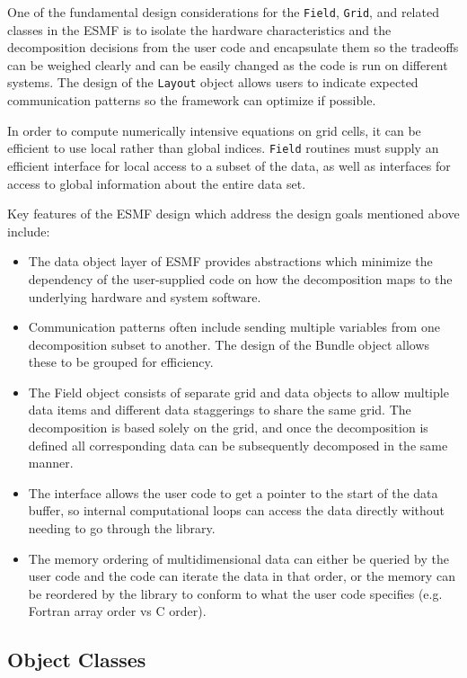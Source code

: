 One of the fundamental design considerations for the {\tt Field},
{\tt Grid}, and related classes in the ESMF is to isolate 
the hardware characteristics and the decomposition decisions from the
user code and encapsulate them so the tradeoffs can be 
weighed clearly and can be easily changed as the code is 
run on different systems.  The design of the {\tt Layout} object
allows users to indicate expected communication patterns so 
the framework can optimize if possible.

In order to compute numerically intensive equations on grid
cells, it can be efficient to use local rather 
than global indices.  {\tt Field} routines
must supply an efficient interface for local access to a
subset of the data, as well as interfaces for access to
global information about the entire data set.

Key features of the ESMF design which address the design goals
mentioned above include:
\begin{itemize}
\item The data object layer of ESMF provides abstractions which
minimize the dependency of the user-supplied code on 
how the decomposition maps to the underlying hardware
and system software.
\item Communication patterns often include sending multiple
variables from one decomposition subset to another.  
The design of the Bundle object
allows these to be grouped for efficiency.
\item The Field object consists of separate grid and data 
objects to allow multiple data items and different data staggerings
to share the same grid.  The decomposition is based solely on
the grid, and once the decomposition is defined all corresponding
data can be subsequently decomposed in the same manner.
\item The interface allows the user code to get a pointer to the
start of the data buffer, so internal computational loops can access
the data directly without needing to go through the library.
\item The memory ordering of multidimensional data can either be
queried by the user code and the code can iterate the data in that
order, or the memory can be reordered by the library to conform to what
the user code specifies (e.g. Fortran array order vs C order).

\end{itemize}

\subsection{Object Classes}

